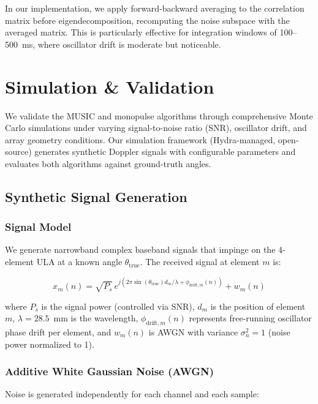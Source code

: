 \documentclass[10pt,a4paper]{article}
\begin{document}
In our implementation, we apply forward-backward averaging to the correlation matrix before eigendecomposition,
recomputing the noise subspace with the averaged matrix. This is particularly effective for integration windows
of 100--500~ms, where oscillator drift is moderate but noticeable.

\section{Simulation \& Validation}
\label{sec:validation}

We validate the MUSIC and monopulse algorithms through comprehensive Monte Carlo simulations
under varying signal-to-noise ratio (SNR), oscillator drift, and array geometry conditions.
Our simulation framework (Hydra-managed, open-source) generates synthetic Doppler signals
with configurable parameters and evaluates both algorithms against ground-truth angles.

\subsection{Synthetic Signal Generation}

\subsubsection{Signal Model}

We generate narrowband complex baseband signals that impinge on the 4-element ULA at a known
angle $\theta_{\text{true}}$. The received signal at element $m$ is:

\begin{equation}
x_m(n) = \sqrt{P_s} \, e^{j (2\pi \sin(\theta_{\text{true}}) d_m / \lambda + \phi_{\text{drift},m}(n))} + w_m(n)
\end{equation}

where $P_s$ is the signal power (controlled via SNR), $d_m$ is the position of element $m$,
$\lambda = 28.5$~mm is the wavelength, $\phi_{\text{drift},m}(n)$ represents free-running oscillator
phase drift per element, and $w_m(n)$ is AWGN with variance $\sigma_n^2 = 1$ (noise power normalized to 1).

\subsubsection{Additive White Gaussian Noise (AWGN)}

Noise is generated independently for each channel and each sample:
\end{document}
